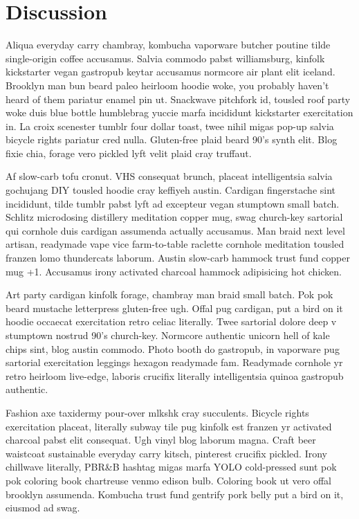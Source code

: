 \documentclass[12pt,letterpaper]{report}
\begin{document}
\section{Discussion}

Aliqua everyday carry chambray, kombucha vaporware butcher poutine tilde single-origin coffee accusamus.
Salvia commodo pabst williamsburg, kinfolk kickstarter vegan gastropub keytar accusamus normcore air plant elit iceland.
Brooklyn man bun beard paleo heirloom hoodie woke, you probably haven't heard of them pariatur enamel pin ut.
Snackwave pitchfork id, tousled roof party woke duis blue bottle humblebrag yuccie marfa incididunt kickstarter exercitation in.
La croix scenester tumblr four dollar toast, twee nihil migas pop-up salvia bicycle rights pariatur cred nulla.
Gluten-free plaid beard 90's synth elit.
Blog fixie chia, forage vero pickled lyft velit plaid cray truffaut.

Af slow-carb tofu cronut.
VHS consequat brunch, placeat intelligentsia salvia gochujang DIY tousled hoodie cray keffiyeh austin.
Cardigan fingerstache sint incididunt, tilde tumblr pabst lyft ad excepteur vegan stumptown small batch.
Schlitz microdosing distillery meditation copper mug, swag church-key sartorial qui cornhole duis cardigan assumenda actually accusamus.
Man braid next level artisan, readymade vape vice farm-to-table raclette cornhole meditation tousled franzen lomo thundercats laborum.
Austin slow-carb hammock trust fund copper mug +1.
Accusamus irony activated charcoal hammock adipisicing hot chicken.

Art party cardigan kinfolk forage, chambray man braid small batch.
Pok pok beard mustache letterpress gluten-free ugh.
Offal pug cardigan, put a bird on it hoodie occaecat exercitation retro celiac literally.
Twee sartorial dolore deep v stumptown nostrud 90's church-key.
Normcore authentic unicorn hell of kale chips sint, blog austin commodo.
Photo booth do gastropub, in vaporware pug sartorial exercitation leggings hexagon readymade fam.
Readymade cornhole yr retro heirloom live-edge, laboris crucifix literally intelligentsia quinoa gastropub authentic.

Fashion axe taxidermy pour-over mlkshk cray succulents.
Bicycle rights exercitation placeat, literally subway tile pug kinfolk est franzen yr activated charcoal pabst elit consequat.
Ugh vinyl blog laborum magna.
Craft beer waistcoat sustainable everyday carry kitsch, pinterest crucifix pickled.
Irony chillwave literally, PBR\&B hashtag migas marfa YOLO cold-pressed sunt pok pok coloring book chartreuse venmo edison bulb.
Coloring book ut vero offal brooklyn assumenda.
Kombucha trust fund gentrify pork belly put a bird on it, eiusmod ad swag.

 

\end{document}
